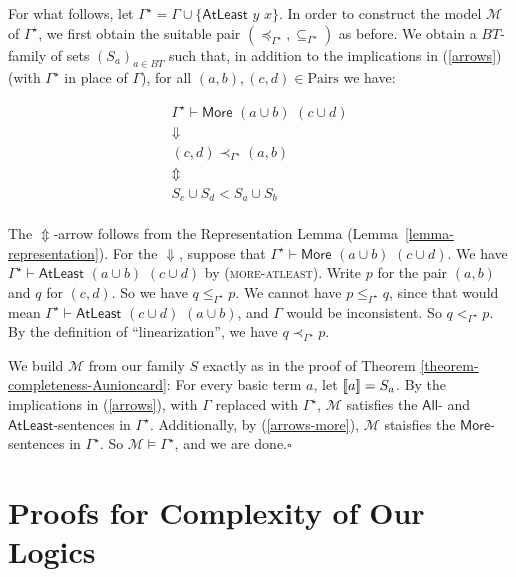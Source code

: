 \documentclass[letterpaper]{article} %
\theoremstyle{definition}
\newcommand{\semantics}[1]{[\![\mbox{\em $ #1 $\/}]\!]}
\newcommand{\Model}{\mathcal{M}}
\newcommand{\set}[1]{\{ #1 \}}
\newcommand{\proves}{\vdash}
\newcommand{\proverule}{\textsc}
\newcommand{\moreatleast}{\proverule{more-atleast}}
\newcommand{\Atleast}[2]{\mathsf{AtLeast}\,\,#1\,\,#2}
\newcommand{\More}[2]{\mathsf{More}\,\,#1\,\,#2}
\newcommand{\AllNoArgs}{\mathsf{All}}
\newcommand{\AtleastNoArgs}{\mathsf{AtLeast}}
\newcommand{\MoreNoArgs}{\mathsf{More}}
\newcommand{\Pairs}{\mbox{Pairs}}
\newcommand{\provsubstar}{\subseteq_{\Gamma^\star}}
\newcommand{\provlestar}{\le_{\Gamma^\star}}
\newcommand{\provltstar}{<_{\Gamma^\star}}
\newcommand{\provlestrictstar}{\provltstar}
\newcommand{\provextendedstar}{\preceq_{\Gamma^\star}}
\newcommand{\provextendedstrictstar}{\prec_{\Gamma^\star}}
\begin{document}
For what follows, let $\Gamma^\star = \Gamma \cup \set{\Atleast{y}{x}}$.  In order to construct the model $\Model$ of $\Gamma^\star$, we first obtain the suitable pair $(\provextendedstar, \provsubstar)$ as before.  We obtain a $BT$-family of sets $(S_{a})_{a \in BT}$ such that, in addition to the implications in (\ref{arrows}) (with $\Gamma^\star$ in place of $\Gamma$), for all $(a, b), (c, d) \in \Pairs$ we have:

\begin{equation}
\label{arrows-more}
\begin{array}{c}
\Gamma^\star \proves \More{(a \cup b)}{(c \cup d)}\\
\Downarrow\\
(c,d) \provextendedstrictstar (a,b)\\
\Updownarrow\\ 
S_c \cup S_d < S_a \cup S_b\\
\end{array}
\end{equation}

The $\Updownarrow$-arrow follows from the Representation Lemma (Lemma~\ref{lemma-representation}).  For the $\Downarrow$, suppose that $\Gamma^\star \proves \More{(a \cup b)}{(c \cup d)}$.  We have $\Gamma^\star \proves \Atleast{(a \cup b)}{(c \cup d)}$ by (\moreatleast).  Write $p$ for the pair $(a, b)$ and $q$ for $(c, d)$.  So we have $q \provlestar p$.  We cannot have $p \provlestar q$, since that would mean $\Gamma^\star \proves \Atleast{(c \cup d)}{(a \cup b)}$, and $\Gamma$ would be inconsistent.  So $q \provlestrictstar p$.  By the definition of ``linearization'', we have $q \provextendedstrictstar p$.

We build $\Model$ from our family $S$ exactly as in the proof of Theorem \ref{theorem-completeness-Aunioncard}:  For every basic term $a$, let $\semantics{a} = S_a$.  By the implications in (\ref{arrows}), with $\Gamma$ replaced with $\Gamma^\star$, $\Model$ satisfies the $\AllNoArgs$- and $\AtleastNoArgs$-sentences in $\Gamma^\star$.  Additionally, by (\ref{arrows-more}), $\Model$ staisfies the $\MoreNoArgs$-sentences in $\Gamma^\star$.  So $\Model \models \Gamma^\star$, and we are done.\hfill$\square$


\section{Proofs for Complexity of Our Logics}
\label{s:supp:complexity-proofs}
\end{document}
